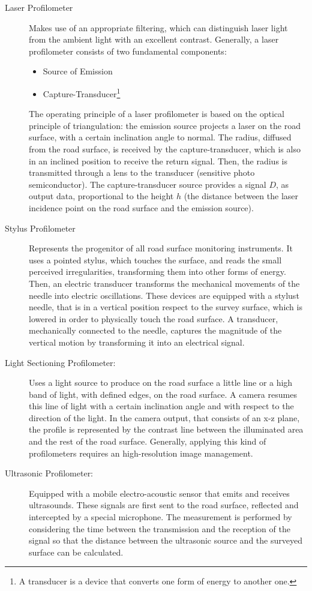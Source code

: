 \documentclass[tesi]{subfiles}
\begin{document}
\begin{enumerate}
\begin{description}
\item [Laser Profilometer] Makes use of an appropriate filtering, which can distinguish laser light from the ambient light with an excellent contrast. Generally, a laser profilometer consists of two fundamental components:
\begin{itemize}
\item Source of Emission
\item Capture-Transducer\footnote{A transducer is a device that converts one form of energy to another one.}
\end{itemize}
The operating principle of a laser profilometer is based on the optical principle of triangulation: the emission source projects a laser on the road surface, with a certain inclination angle to normal. The radius, diffused from the road surface, is received by the capture-transducer, which is also in an inclined position to receive the return signal. Then, the radius is transmitted through a lens to the transducer\cite{arnberg1991laser} (sensitive photo semiconductor). The capture-transducer source provides a signal $D$, as output data, proportional to the height $h$ (the distance between the laser incidence point on the road surface and the emission source).
\clearpage
\item [Stylus Profilometer] Represents the progenitor of all road surface monitoring instruments. It uses a pointed stylus, which touches the surface, and reads the small perceived irregularities, transforming them into other forms of energy. Then, an electric transducer transforms the mechanical movements of the needle into electric oscillations. These devices are equipped with a stylust needle, that is in a vertical position respect to the survey surface, which is lowered in order to physically touch the road surface. A transducer, mechanically connected to the needle, captures the magnitude of the vertical motion by transforming it into an electrical signal.
\item [Light Sectioning Profilometer:] Uses a light source to produce on the road surface a little line or a high band of light, with defined edges, on the road surface. A camera resumes this line of light with a certain inclination angle and with respect to the direction of the light. In the camera output, that consists of an x-z plane, the profile is represented by the contrast line between the illuminated area and the rest of the road surface. Generally, applying this kind of profilometers requires an high-resolution image management.

\item [Ultrasonic Profilometer:] Equipped with a mobile electro-acoustic sensor that emits and receives ultrasounds. These signals are first sent to the road surface, reflected and intercepted by a special microphone. The measurement is performed by considering the time between the transmission and the reception of the signal so that the distance between the ultrasonic source and the surveyed surface can be calculated\cite{little_book}.
\end{description}

\end{enumerate}
\clearpage
\end{document}

